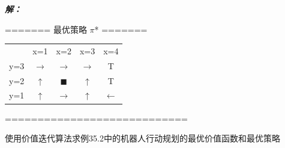 \documentclass[12pt, a4paper]{article}
\newenvironment{solution}{
	\par\vspace{0.2cm}\noindent\textbf{\color{themecolor} \textit{解：}}
}{
	\par\vspace{0.5cm} %
}
\begin{document}
\begin{solution}
{			\vspace{5.0cm} %
			
			\noindent
			======= 最优策略 $\pi$* ======= \\[10pt]
			\begin{tabular}{@{} l c c c c @{}} 
				&      x=1      &      x=2       &      x=3      &      x=4      \\
				y=3   & $\rightarrow$ & $\rightarrow$  & $\rightarrow$ &       T       \\
				y=2   &   $\uparrow$  & $\blacksquare$ &   $\uparrow$  &       T       \\
				y=1   &   $\uparrow$  & $\rightarrow$  &   $\uparrow$  & $\leftarrow$  \\
			\end{tabular}
			
			\vspace{10pt}
			\noindent
			============================
		}
	\end{solution}
	
	
	\clearpage
	\begin{problem}[习题 35.10]
		使用价值迭代算法求例35.2中的机器人行动规划的最优价值函数和最优策略
	\end{problem}
	
\end{document}
